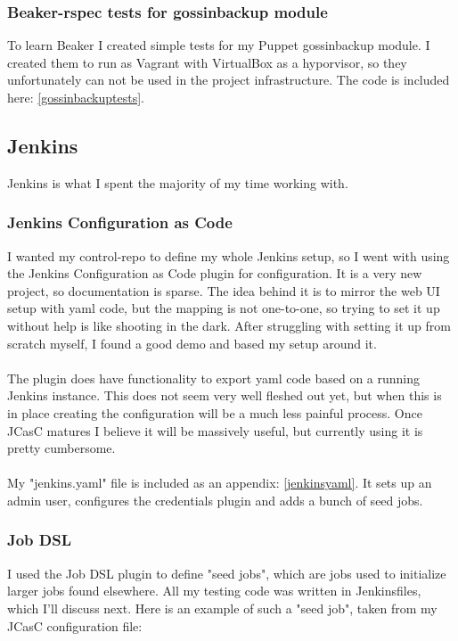 \subsubsection{Beaker-rspec tests for gossinbackup module}

To learn Beaker I created simple tests for my Puppet gossinbackup module. I created them to run as Vagrant with VirtualBox as a hyporvisor, so they unfortunately can not be used in the project infrastructure. The code is included here: \ref{gossinbackuptests}.

\subsection{Jenkins}

Jenkins is what I spent the majority of my time working with.

\subsubsection{Jenkins Configuration as Code}

I wanted my control-repo to define my whole Jenkins setup, so I went with using the Jenkins Configuration as Code plugin for configuration. It is a very new project, so documentation is sparse. The idea behind it is to mirror the web UI setup with yaml code, but the mapping is not one-to-one, so trying to set it up without help is like shooting in the dark. After struggling with setting it up from scratch myself, I found a good demo\cite{jcascdemogithub} and based my setup around it. 
\\
\\
The plugin does have functionality to export yaml code based on a running Jenkins instance. This does not seem very well fleshed out yet, but when this is in place creating the configuration will be a much less painful process. Once JCasC matures I believe it will be massively useful, but currently using it is pretty cumbersome.
\\
\\
My "jenkins.yaml" file is included as an appendix: \ref{jenkinsyaml}. It sets up an admin user, configures the credentials plugin and adds a bunch of seed jobs.

\subsubsection{Job DSL}

I used the Job DSL plugin \cite{jobdslgithub} to define "seed jobs", which are jobs used to initialize larger jobs found elsewhere. All my testing code was written in Jenkinsfiles, which I'll discuss next. Here is an example of such a "seed job", taken from my JCasC configuration file:

